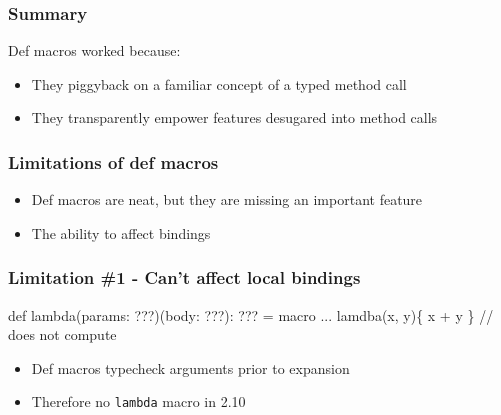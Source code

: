 \documentclass[svgnames,hyperref={bookmarks=false}]{beamer}
\begin{document}
\begin{frame}[fragile]
\frametitle{Summary}

Def macros worked because:
\begin{itemize}
\item They piggyback on a familiar concept of a typed method call
\item They transparently empower features desugared into method calls
\end{itemize}
\end{frame}

\begin{frame}[fragile]
\frametitle{}

\vskip40pt
\begin{center}
\end{center}
\end{frame}

\begin{frame}[fragile]
\frametitle{Limitations of def macros}

\begin{itemize}
\item Def macros are neat, but they are missing an important feature
\item The ability to affect bindings
\end{itemize}
\end{frame}

\begin{frame}[fragile]
\frametitle{Limitation \#1 - Can't affect local bindings}

\begin{semiverbatim}
\alert{def lambda(params: ???)(body: ???): ??? = macro ...}
\alert{lamdba(x, y)\{} x + y \alert{\}} // does not compute

\end{semiverbatim}

\begin{itemize}
\item Def macros typecheck arguments prior to expansion
\item Therefore no \texttt{lambda} macro in 2.10
\end{itemize}
\end{frame}
\end{document}
